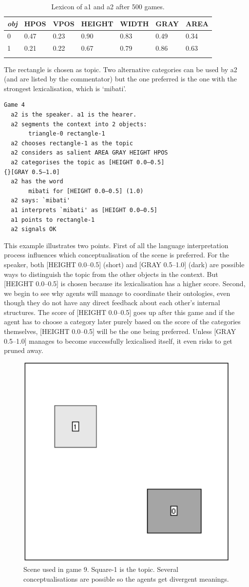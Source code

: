 \begin{table}
\begin{center}
\begin{tabular}{ l  l  l  l  l  l  l }
\lsptoprule
{\itshape obj} & HPOS & VPOS & HEIGHT & WIDTH & GRAY & AREA \\ \midrule
0 & 0.47 & 0.23 & 0.90 & 0.83 & 0.49 & 0.34\\ 
1 & 0.21 & 0.22 & 0.67 & 0.79 & 0.86 & 0.63\\ 
\lspbottomrule
\end{tabular}
\caption{\label{tab:mibati}Lexicon of a1 and a2 after 500 games.}
\end{center}
\end{table}
The rectangle is chosen as topic. Two alternative
categories can be used by {\bfshape  a2} (and are listed
by the commentator) but the one preferred
is the one with the strongest lexicalisation, which is 
`mibati'.
\begin{verbatim}
Game 4
  a2 is the speaker. a1 is the hearer. 
  a2 segments the context into 2 objects: 
       triangle-0 rectangle-1
  a2 chooses rectangle-1 as the topic 
  a2 considers as salient AREA GRAY HEIGHT HPOS 
  a2 categorises the topic as [HEIGHT 0.0–0.5] 
{}[GRAY 0.5–1.0]
  a2 has the word
       mibati for [HEIGHT 0.0–0.5] (1.0)
  a2 says: `mibati'
  a1 interprets `mibati' as [HEIGHT 0.0–0.5]
  a1 points to rectangle-1
  a2 signals OK 
\end{verbatim}

This example illustrates two points. First of all the 
language interpretation process influences 
which conceptualisation of the scene is preferred. For 
the speaker, both [HEIGHT 0.0–0.5] (short) and [GRAY 0.5–1.0]
(dark) are possible ways to distinguish the topic from the 
other objects in the context. But [HEIGHT 0.0–0.5] is 
chosen because its lexicalisation has a higher score. 
Second, we begin to see why agents will manage to 
coordinate their ontologies, even though they do not 
have any direct feedback about each other's internal 
structures. The score of [HEIGHT 0.0–0.5] goes up after
this game and if the 
agent has to choose a category later purely based on 
the score of the categories themselves, [HEIGHT 0.0–0.5] will 
be the one being preferred. Unless [GRAY 0.5–1.0] manages
to become successfully lexicalised itself, it even risks to 
get pruned away. 


\begin{figure}[htbp]
  \centerline{\includegraphics[width=.40\textwidth]{chap6/figs/scene-game9.pdf}}
\caption{\label{game9}Scene used
in game 9. Square-1 is the topic. Several conceptualisations are 
possible so the agents get divergent meanings.}
\end{figure}


